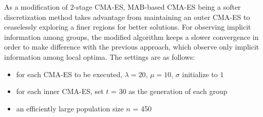 As a modification of 2-stage CMA-ES, MAB-based CMA-ES being a softer
discretization method takes advantage from maintaining an outer CMA-ES
to ceaselessly exploring a finer regions for better solutions.
For observing implicit information among groups, the modified algorithm
keeps a slower convergence in order to make difference with the previous
approach, which observe only implicit information among local optima.
The settings are as follows:
\begin{itemize}
  \item{for each CMA-ES to be executed, $\lambda = 20$,
      $\mu=10$, $\sigma$ initialize to $1$}
  \item{for each inner CMA-ES, set $t$ = 30 as the generation of each
    group}
  \item{an efficiently large population size $n$ = 450}
\end{itemize}


